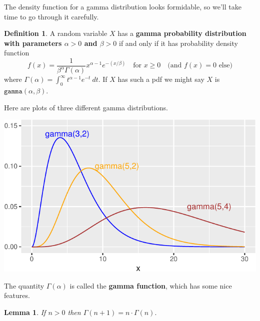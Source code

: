 \documentclass[
]{book}
\newtheorem{lemma}{Lemma}[chapter]
\theoremstyle{definition}
\newtheorem{definition}{Definition}[chapter]
\theoremstyle{definition}
\theoremstyle{definition}
\theoremstyle{definition}
\theoremstyle{remark}
\begin{document}
The density function for a gamma distribution looks formidable, so we'll take time to go through it carefully.

\begin{definition}
\protect\hypertarget{def:gamma-distribution}{}\label{def:gamma-distribution}A random variable \(X\) has a \textbf{gamma probability distribution with parameters \(\alpha>0\) and \(\beta>0\)} if and only if it has probability density function
\[
f(x)=
\frac{1}{\beta^\alpha \Gamma(\alpha)}x^{\alpha-1}e^{-(x/\beta)}~~~ \text{ for }x \geq 0~~~ \text{ (and }f(x) = 0\text{ else)}
\]
where \(\displaystyle\Gamma(\alpha) = \int_0^\infty t^{\alpha-1}e^{-t}~dt\).
If \(X\) has such a pdf we might say \(X\) is \(\texttt{gamma}(\alpha,\beta)\).
\end{definition}

Here are plots of three different gamma distributions.

\begin{center}\includegraphics{math340-notes_files/figure-latex/3-gamma-plots-1} \end{center}

The quantity \(\Gamma(\alpha)\) is called the \textbf{gamma function}, which has some nice features.

\begin{lemma}
\protect\hypertarget{lem:gamma-fcn-ind-step}{}\label{lem:gamma-fcn-ind-step}If \(n > 0\) then \(\Gamma(n+1) = n \cdot \Gamma(n).\)
\end{lemma}
\end{document}
